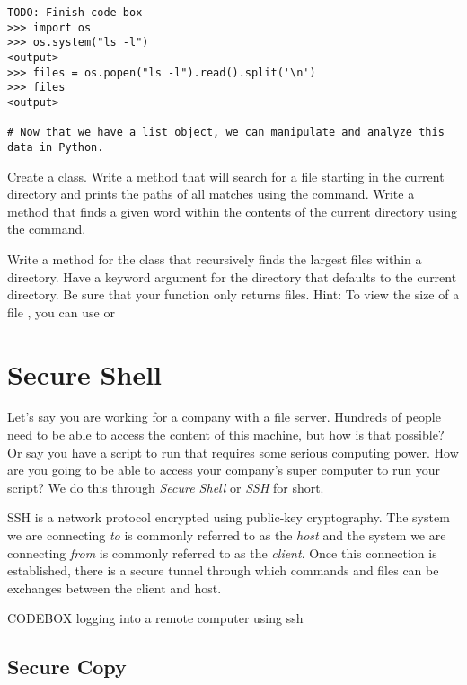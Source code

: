 \begin{lstlisting}
TODO: Finish code box
>>> import os
>>> os.system("ls -l")
<output>
>>> files = os.popen("ls -l").read().split('\n')
>>> files
<output>

# Now that we have a list object, we can manipulate and analyze this data in Python.
\end{lstlisting}

\begin{problem}
Create a  class. Write a  method that will search for a file starting in the current directory and prints the paths of all matches using the  command. Write a  method that finds a given word within the contents of the current directory using the  command.
\end{problem}

\begin{problem}
Write a method for the  class that recursively finds the  largest files within a directory. Have a keyword argument for the directory that defaults to the current directory. Be sure that your function only returns files. Hint: To view the size of a file , you can use  or 
\end{problem}

\section*{Secure Shell}

Let's say you are working for a company with a file server. Hundreds of people need to be able to access the content of this machine, but how is that possible? Or say you have a script to run that requires some serious computing power. How are you going to be able to access your company's super computer to run your script? We do this through \emph{Secure Shell} or \emph{SSH} for short.

SSH is a network protocol encrypted using public-key cryptography. The system we are connecting \emph{to} is commonly referred to as the \emph{host} and the system we are connecting \emph{from} is commonly referred to as the \emph{client}. Once this connection is established, there is a secure tunnel through which commands and files can be exchanges between the client and host.

CODEBOX
logging into a remote computer using ssh

\subsection*{Secure Copy}

